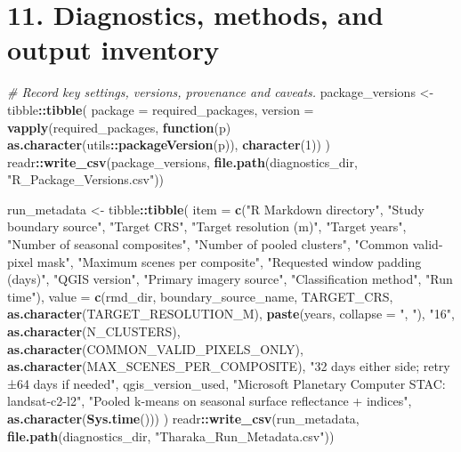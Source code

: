 \documentclass[
]{article}
\newenvironment{Shaded}{\begin{snugshade}}{\end{snugshade}}
\newcommand{\AttributeTok}[1]{\textcolor[rgb]{0.13,0.29,0.53}{#1}}
\newcommand{\CommentTok}[1]{\textcolor[rgb]{0.56,0.35,0.01}{\textit{#1}}}
\newcommand{\ControlFlowTok}[1]{\textcolor[rgb]{0.13,0.29,0.53}{\textbf{#1}}}
\newcommand{\DecValTok}[1]{\textcolor[rgb]{0.00,0.00,0.81}{#1}}
\newcommand{\FunctionTok}[1]{\textcolor[rgb]{0.13,0.29,0.53}{\textbf{#1}}}
\newcommand{\NormalTok}[1]{#1}
\newcommand{\OtherTok}[1]{\textcolor[rgb]{0.56,0.35,0.01}{#1}}
\newcommand{\SpecialCharTok}[1]{\textcolor[rgb]{0.81,0.36,0.00}{\textbf{#1}}}
\newcommand{\StringTok}[1]{\textcolor[rgb]{0.31,0.60,0.02}{#1}}
\begin{document}
\section{11. Diagnostics, methods, and output
inventory}\label{diagnostics-methods-and-output-inventory}

\begin{Shaded}
\begin{Highlighting}[]
\CommentTok{\# Record key settings, versions, provenance and caveats.}
\NormalTok{package\_versions }\OtherTok{\textless{}{-}}\NormalTok{ tibble}\SpecialCharTok{::}\FunctionTok{tibble}\NormalTok{(}
  \AttributeTok{package =}\NormalTok{ required\_packages,}
  \AttributeTok{version =} \FunctionTok{vapply}\NormalTok{(required\_packages, }\ControlFlowTok{function}\NormalTok{(p) }\FunctionTok{as.character}\NormalTok{(utils}\SpecialCharTok{::}\FunctionTok{packageVersion}\NormalTok{(p)), }\FunctionTok{character}\NormalTok{(}\DecValTok{1}\NormalTok{))}
\NormalTok{)}
\NormalTok{readr}\SpecialCharTok{::}\FunctionTok{write\_csv}\NormalTok{(package\_versions, }\FunctionTok{file.path}\NormalTok{(diagnostics\_dir, }\StringTok{"R\_Package\_Versions.csv"}\NormalTok{))}

\NormalTok{run\_metadata }\OtherTok{\textless{}{-}}\NormalTok{ tibble}\SpecialCharTok{::}\FunctionTok{tibble}\NormalTok{(}
  \AttributeTok{item =} \FunctionTok{c}\NormalTok{(}\StringTok{"R Markdown directory"}\NormalTok{, }\StringTok{"Study boundary source"}\NormalTok{, }\StringTok{"Target CRS"}\NormalTok{, }\StringTok{"Target resolution (m)"}\NormalTok{,}
           \StringTok{"Target years"}\NormalTok{, }\StringTok{"Number of seasonal composites"}\NormalTok{, }\StringTok{"Number of pooled clusters"}\NormalTok{,}
           \StringTok{"Common valid{-}pixel mask"}\NormalTok{, }\StringTok{"Maximum scenes per composite"}\NormalTok{, }\StringTok{"Requested window padding (days)"}\NormalTok{,}
           \StringTok{"QGIS version"}\NormalTok{, }\StringTok{"Primary imagery source"}\NormalTok{, }\StringTok{"Classification method"}\NormalTok{, }\StringTok{"Run time"}\NormalTok{),}
  \AttributeTok{value =} \FunctionTok{c}\NormalTok{(rmd\_dir, boundary\_source\_name, TARGET\_CRS, }\FunctionTok{as.character}\NormalTok{(TARGET\_RESOLUTION\_M),}
            \FunctionTok{paste}\NormalTok{(years, }\AttributeTok{collapse =} \StringTok{", "}\NormalTok{), }\StringTok{"16"}\NormalTok{, }\FunctionTok{as.character}\NormalTok{(N\_CLUSTERS),}
            \FunctionTok{as.character}\NormalTok{(COMMON\_VALID\_PIXELS\_ONLY), }\FunctionTok{as.character}\NormalTok{(MAX\_SCENES\_PER\_COMPOSITE), }\StringTok{"32 days either side; retry ±64 days if needed"}\NormalTok{,}
\NormalTok{            qgis\_version\_used, }\StringTok{"Microsoft Planetary Computer STAC: landsat{-}c2{-}l2"}\NormalTok{, }\StringTok{"Pooled k{-}means on seasonal surface reflectance + indices"}\NormalTok{, }\FunctionTok{as.character}\NormalTok{(}\FunctionTok{Sys.time}\NormalTok{()))}
\NormalTok{)}
\NormalTok{readr}\SpecialCharTok{::}\FunctionTok{write\_csv}\NormalTok{(run\_metadata, }\FunctionTok{file.path}\NormalTok{(diagnostics\_dir, }\StringTok{"Tharaka\_Run\_Metadata.csv"}\NormalTok{))}


\end{Highlighting}
\end{Shaded}
\end{document}
